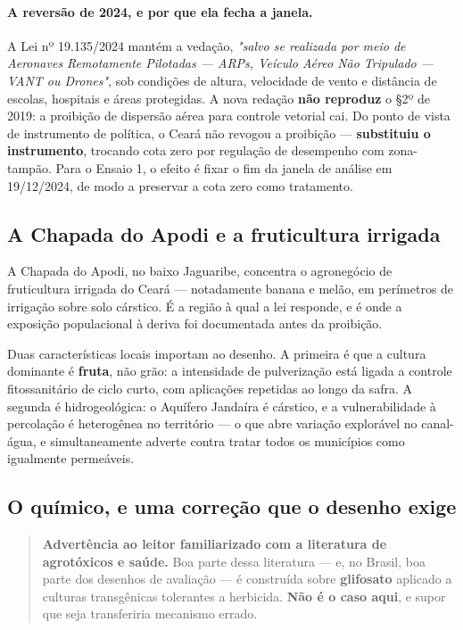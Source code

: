 \paragraph{A reversão de 2024, e por que ela fecha a janela.} A Lei nº
19.135/2024 mantém a vedação, \emph{"salvo se realizada por meio de Aeronaves
Remotamente Pilotadas --- ARPs, Veículo Aéreo Não Tripulado --- VANT ou Drones"},
sob condições de altura, velocidade de vento e distância de escolas, hospitais e
áreas protegidas. A nova redação \textbf{não reproduz} o §2º de 2019: a proibição
de dispersão aérea para controle vetorial cai. Do ponto de vista de instrumento
de política, o Ceará não revogou a proibição --- \textbf{substituiu o
instrumento}, trocando cota zero por regulação de desempenho com zona-tampão.
Para o Ensaio 1, o efeito é fixar o fim da janela de análise em 19/12/2024, de
modo a preservar a cota zero como tratamento.

\subsection{A Chapada do Apodi e a fruticultura irrigada}
\label{sub:chapada}

A Chapada do Apodi, no baixo Jaguaribe, concentra o agronegócio de fruticultura
irrigada do Ceará --- notadamente banana e melão, em perímetros de irrigação
sobre solo cárstico. É a região à qual a lei responde, e é onde a exposição
populacional à deriva foi documentada antes da proibição.

Duas características locais importam ao desenho. A primeira é que a cultura
dominante é \textbf{fruta}, não grão: a intensidade de pulverização está ligada a
controle fitossanitário de ciclo curto, com aplicações repetidas ao longo da
safra. A segunda é hidrogeológica: o Aquífero Jandaíra é cárstico, e a
vulnerabilidade à percolação é heterogênea no território --- o que abre variação
explorável no canal-água, e simultaneamente adverte contra tratar todos os
municípios como igualmente permeáveis.

\subsection{O químico, e uma correção que o desenho exige}
\label{sub:quimico}

\begin{quote}
\textbf{Advertência ao leitor familiarizado com a literatura de agrotóxicos e
saúde.} Boa parte dessa literatura --- e, no Brasil, boa parte dos desenhos de
avaliação --- é construída sobre \textbf{glifosato} aplicado a culturas
transgênicas tolerantes a herbicida. \textbf{Não é o caso aqui}, e supor que seja
transferiria mecanismo errado.
\end{quote}


